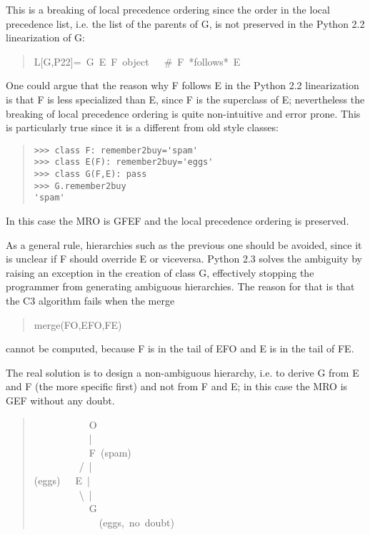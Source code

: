 \documentclass[10pt,english]{article}
\begin{document}
This is a breaking of local precedence ordering since the order in the
local precedence list, i.e. the list of the parents of G, is not
preserved in the Python 2.2 linearization of G:
\begin{quote}
\begin{ttfamily}\begin{flushleft}
\mbox{L[G,P22]=~G~E~F~object~~~{\#}~F~*follows*~E}
\end{flushleft}\end{ttfamily}
\end{quote}

One could argue that the reason why F follows E in the Python 2.2
linearization is that F is less specialized than E, since F is the
superclass of E; nevertheless the breaking of local precedence ordering
is quite non-intuitive and error prone.  This is particularly true since
it is a different from old style classes:
\begin{quote}
\begin{verbatim}>>> class F: remember2buy='spam'
>>> class E(F): remember2buy='eggs'
>>> class G(F,E): pass
>>> G.remember2buy
'spam'\end{verbatim}
\end{quote}

In this case the MRO is GFEF and the local precedence ordering is
preserved.

As a general rule, hierarchies such as the previous one should be
avoided, since it is unclear if F should override E or viceversa.
Python 2.3 solves the ambiguity by raising an exception in the creation
of class G, effectively stopping the programmer from generating
ambiguous hierarchies.  The reason for that is that the C3 algorithm
fails when the merge
\begin{quote}
\begin{ttfamily}\begin{flushleft}
\mbox{merge(FO,EFO,FE)}
\end{flushleft}\end{ttfamily}
\end{quote}

cannot be computed, because F is in the tail of EFO and E is in the tail
of FE.

The real solution is to design a non-ambiguous hierarchy, i.e. to derive
G from E and F (the more specific first) and not from F and E; in this
case the MRO is GEF without any doubt.
\begin{quote}
\begin{ttfamily}\begin{flushleft}
\mbox{~~~~~~~~~~~O}\\
\mbox{~~~~~~~~~~~|}\\
\mbox{~~~~~~~~~~~F~(spam)}\\
\mbox{~~~~~~~~~/~|}\\
\mbox{(eggs)~~~E~|}\\
\mbox{~~~~~~~~~{\textbackslash}~|}\\
\mbox{~~~~~~~~~~~G}\\
\mbox{~~~~~~~~~~~~~(eggs,~no~doubt)}
\end{flushleft}\end{ttfamily}
\end{quote}
\end{document}
